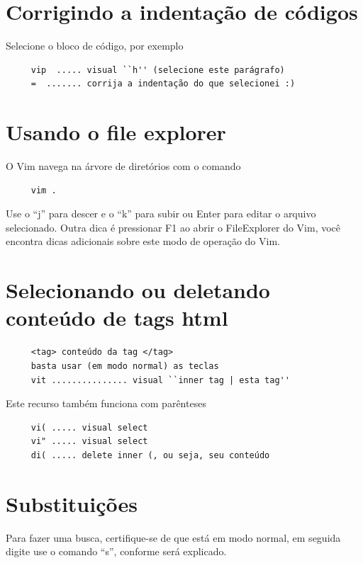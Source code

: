 \documentclass[10pt,a4paper,openany]{book}
\begin{document}
\section{Corrigindo a indentação de códigos}
\label{Corrigindo a indentação de códigos}
Selecione o bloco de código, por exemplo

\begin{verbatim}
     vip  ..... visual ``h'' (selecione este parágrafo)
     =  ....... corrija a indentação do que selecionei :)
\end{verbatim}

\section{Usando o file explorer}
\label{Usando o file explorer}
O Vim navega na árvore de diretórios com o comando

\begin{verbatim}
     vim .
\end{verbatim}

Use o ``j'' para descer e o ``k'' para subir ou Enter para editar o
arquivo selecionado. Outra dica é pressionar F1 ao abrir o
FileExplorer do Vim, você encontra dicas adicionais sobre este modo de
operação do Vim.

\section{Selecionando ou deletando conteúdo de tags html}
\label{Selecionando ou deletando conteúdo de tags html}

\begin{verbatim}
     <tag> conteúdo da tag </tag>
     basta usar (em modo normal) as teclas
     vit ............... visual ``inner tag | esta tag''
\end{verbatim}

Este recurso também funciona com parênteses

\begin{verbatim}
     vi( ..... visual select
     vi" ..... visual select
     di( ..... delete inner (, ou seja, seu conteúdo
\end{verbatim}


\section{Substituições }
\label{Substituições }

Para fazer uma busca, certifique-se de que está em modo normal, em
seguida digite use o comando ``s'', conforme será explicado.
\end{document}
